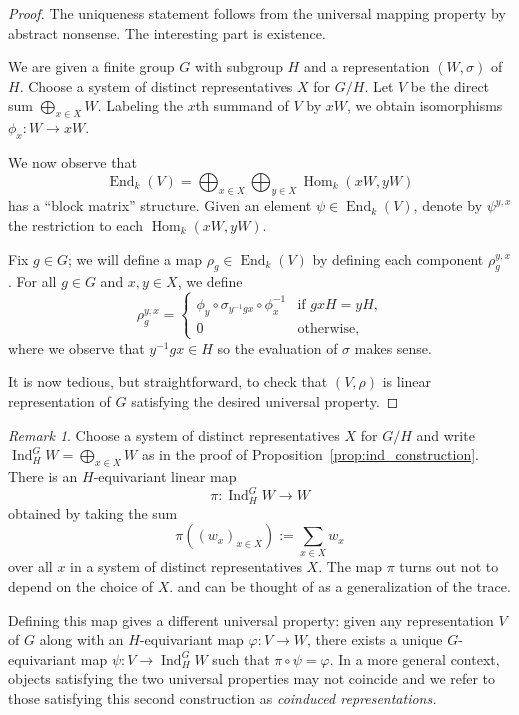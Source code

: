 \documentclass[12pt]{article}
\theoremstyle{plain}
\theoremstyle{definition}
\theoremstyle{remark}
\newtheorem{remark}[theorem]{Remark}
\numberwithin{equation}{section}
\begin{document}
\begin{proof}
The uniqueness statement follows from the universal mapping property by
abstract nonsense.  The interesting part is existence.

We are given a finite group $G$ with subgroup $H$ and a representation
$(W,\sigma)$ of $H$.
Choose a system of distinct representatives $X$ for $G/H$.
Let $V$ be the direct sum $\bigoplus_{x \in X} W$.
Labeling the $x$th summand of $V$ by $xW$,
we obtain isomorphisms $\phi_x : W \to xW$.

We now observe that
\[
\operatorname{End}_k(V) = \bigoplus_{x \in X} \bigoplus_{y \in X}
\operatorname{Hom}_k(xW,yW)
\]
has a ``block matrix'' structure.
Given an element $\psi \in \operatorname{End}_k(V)$,
denote by $\psi^{y,x}$ the restriction to each
$\operatorname{Hom}_k(xW,yW)$.

Fix $g \in G$; we will define a map
$\rho_g \in \operatorname{End}_k(V)$ by defining each component
$\rho_g^{y,x}$.
For all $g \in G$ and $x,y \in X$, we define
\[
\rho_g^{y,x} =
\begin{cases}
\phi_y \circ \sigma_{y^{-1}gx} \circ \phi_x^{-1} & \textrm{if $gxH=yH$,}\\
0 & \textrm{otherwise},
\end{cases}
\]
where we observe that $y^{-1}gx \in H$ so the evaluation of $\sigma$
makes sense.

It is now tedious, but straightforward, to check that $(V,\rho)$ is linear
representation of $G$ satisfying the desired universal property.
\end{proof}

\begin{remark}
Choose a system of distinct representatives $X$ for $G/H$ and
write $\operatorname{Ind}^G_H W = \bigoplus_{x \in X} W$
as in the proof of Proposition~\ref{prop:ind_construction}.
There is an $H$-equivariant linear map
\[
\pi : \operatorname{Ind}^G_H W \to W
\]
obtained by taking the sum
\[
\pi\left( (w_x)_{x \in X} \right) :=
\sum_{x \in X} w_x
\]
over all $x$ in a system of distinct representatives $X$.
The map $\pi$ turns out not to depend on the choice of $X$.
and can be thought of as a generalization of the trace.

Defining this map gives a different universal property:
given any representation $V$ of $G$ along with an $H$-equivariant map
$\varphi : V \to W$, there exists a unique $G$-equivariant
map $\psi : V \to \operatorname{Ind}^G_H W$ such that
$\pi \circ \psi = \varphi$.
In a more general context, objects satisfying the two universal
properties may not coincide and we refer to those satisfying this second
construction as \emph{coinduced representations.}
\end{remark}
\end{document}
